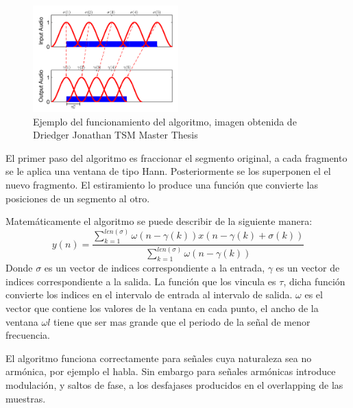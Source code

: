 \documentclass[../ASSD_TP2.tex]{subfiles}
\begin{document}
\begin{figure}[H]
  \centering
   \includegraphics[width=0.5\textwidth]{figures/ola.png}
  \caption{Ejemplo del funcionamiento del algoritmo, imagen obtenida de Driedger Jonathan TSM Master Thesis}
\end{figure}
El primer paso del algoritmo es fraccionar el segmento original, a cada fragmento se le aplica una ventana de tipo Hann. Posteriormente se los superponen el el nuevo fragmento. El estiramiento lo produce una función que convierte las posiciones de un segmento al otro.
\par Matemáticamente el algoritmo se puede describir de la siguiente manera:
\begin{equation}
y(n)=\frac{\sum_{k=1}^{len(\sigma)} \omega(n - \gamma (k)) x(n-\gamma (k) + \sigma (k))}{\sum_{k=1}^{len(\sigma)}\omega(n - \gamma (k))}
\end{equation}
Donde $\sigma$ es un vector de indices correspondiente a la entrada, $\gamma$ es un vector de indices correspondiente a la salida. La función que los vincula es $\tau$, dicha función convierte los indices en el intervalo de entrada al intervalo de salida.
$\omega$ es el vector que contiene los valores de la ventana en cada punto, el ancho de la ventana $\omega l$ tiene que ser mas grande que el periodo de la se\~nal de menor frecuencia.

\par El algoritmo funciona correctamente para se\~nales cuya naturaleza sea no armónica, por ejemplo el habla. Sin embargo para se\~nales armónicas introduce modulación, y saltos de fase, a los desfajases producidos en el overlapping de las muestras.  
\end{document}
